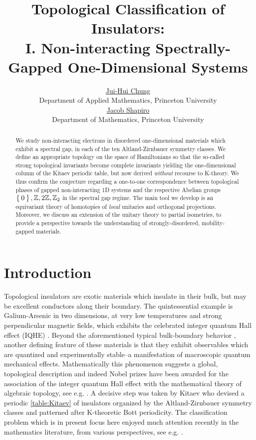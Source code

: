 \documentclass[a4paper,10pt]{article}
\title{Topological Classification of Insulators:\\ I. Non-interacting Spectrally-Gapped One-Dimensional Systems}
\author{\href{mailto:jc1220@math.princeton.edu}{Jui-Hui Chung}\\
	{\footnotesize Department of Applied Mathematics, Princeton University }\\
	\href{mailto:jacobshapiro@princeton.edu}{Jacob Shapiro}\\
	{\footnotesize Department of Mathematics, Princeton University}
}
\makeatletter
\newcommand{\reqnomode}{\tagsleft@false\let\veqno\@@eqno}
\numberwithin{equation}{section}
\theoremstyle{plain}
\theoremstyle{plain}
\theoremstyle{plain}
\theoremstyle{plain}
\theoremstyle{plain}
\theoremstyle{remark}
\theoremstyle{definition}
\theoremstyle{plain}
\newcommand{\ZZ}{\mathbb{Z}}
\makeatother
\begin{document}
	\reqnomode
	
	\maketitle
	\begin{abstract}
		We study non-interacting electrons in disordered one-dimensional materials which exhibit a spectral gap, in each of the ten Altland-Zirnbauer symmetry classes. We define an appropriate topology on the space of Hamiltonians so that the so-called strong topological invariants become complete invariants yielding the one-dimensional column of the Kitaev periodic table, but now derived \emph{without} recourse to K-theory. We thus confirm the conjecture regarding a one-to-one correspondence between topological phases of gapped non-interacting 1D systems and the respective Abelian groups $\Set{0},\ZZ,2\ZZ,\ZZ_2$ in the spectral gap regime. The main tool we develop is an equivariant theory of homotopies of \emph{local} unitaries and orthogonal projections. Moreover, we discuss an extension of the unitary theory to partial isometries, to provide a perspective towards the understanding of strongly-disordered, mobility-gapped materials.
	\end{abstract}
	\tableofcontents
	\section{Introduction}
	Topological insulators \cite{Hasan_Kane_2010} are exotic materials which insulate in their bulk, but may be excellent conductors along their boundary. The quintessential example is Galium-Arsenic in two dimensions, at very low temperatures and strong perpendicular magnetic fields, which exhibits the celebrated integer quantum Hall effect (IQHE) \cite{vKDP1980_PhysRevLett.45.494}. Beyond the aforementioned typical bulk-boundary behavior \cite{Graf07}, another defining feature of these materials is that they exhibit observables which are quantized and experimentally stable--a manifestation of macroscopic quantum mechanical effects. Mathematically this phenomenon suggests a global, topological description and indeed Nobel prizes have been awarded \cite{Nobel2016} for the association of the integer quantum Hall effect with the mathematical theory of algebraic topology, see e.g. \cite{TKNN_1982_PhysRevLett.49.405,ASS_1983_PhysRevLett.51.51}. A decisive step was taken by Kitaev \cite{Kitaev2009} who devised a periodic \cref{table:Kitaev} of insulators organized by the Altland-Zirnbauer symmetry classes \cite{AltlandZirnbauer1997} and patterned after K-theoretic Bott periodicity. The classification problem which is in present focus here enjoyed much attention recently in the mathematics literature, from various perspectives, see e.g. \cite{FreedMoore2013,DeNittisGomi2015,Kubota2016,Thiang2016,BourneCareyRennie2016,PSB_2016,GrossmannSchulz-Baldes2016,KatsuraKoma2018,Kellendonk2019,AlldridgeMaxZirnbauer2020,BourneSchulz-Baldes2020,BourneOgata2021,AvronTurner2022,GontierMonacoSolal2022}.
	
\end{document}
